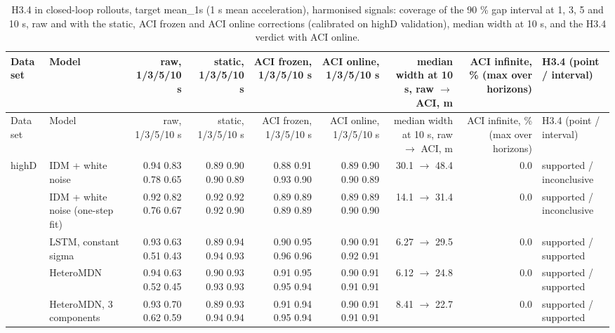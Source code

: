 \begingroup
\footnotesize
\begin{longtable}{llrrrrrrl}
\caption{H3.4 in closed-loop rollouts, target mean\_1s (1 s mean acceleration), harmonised signals: coverage of the 90 \% gap interval at 1, 3, 5 and 10 s, raw and with the static, ACI frozen and ACI online corrections (calibrated on highD validation), median width at 10 s, and the H3.4 verdict with ACI online.}\label{tab:t4-coverage--harmonised--mean-1s} \\
\toprule
Data set & Model & raw, 1/3/5/10 s & static, 1/3/5/10 s & ACI frozen, 1/3/5/10 s & ACI online, 1/3/5/10 s & median width at 10 s, raw $\rightarrow$ ACI, m & ACI infinite, \% (max over horizons) & H3.4 (point / interval) \\
\midrule
\endfirsthead
\toprule
Data set & Model & raw, 1/3/5/10 s & static, 1/3/5/10 s & ACI frozen, 1/3/5/10 s & ACI online, 1/3/5/10 s & median width at 10 s, raw $\rightarrow$ ACI, m & ACI infinite, \% (max over horizons) & H3.4 (point / interval) \\
\midrule
\endhead
\bottomrule
\endlastfoot
highD & IDM + white noise & 0.94 0.83 0.78 0.65 & 0.89 0.90 0.90 0.89 & 0.88 0.91 0.93 0.90 & 0.89 0.90 0.90 0.89 & 30.1 $\rightarrow$ 48.4 & 0.0 & supported / inconclusive \\
 & IDM + white noise (one-step fit) & 0.92 0.82 0.76 0.67 & 0.92 0.92 0.92 0.90 & 0.89 0.89 0.89 0.89 & 0.89 0.89 0.90 0.90 & 14.1 $\rightarrow$ 31.4 & 0.0 & supported / inconclusive \\
 & LSTM, constant sigma & 0.93 0.63 0.51 0.43 & 0.89 0.94 0.94 0.93 & 0.90 0.95 0.96 0.96 & 0.90 0.91 0.92 0.91 & 6.27 $\rightarrow$ 29.5 & 0.0 & supported / supported \\
 & HeteroMDN & 0.94 0.63 0.52 0.45 & 0.90 0.93 0.93 0.93 & 0.91 0.95 0.95 0.94 & 0.90 0.91 0.91 0.91 & 6.12 $\rightarrow$ 24.8 & 0.0 & supported / supported \\
 & HeteroMDN, 3 components & 0.93 0.70 0.62 0.59 & 0.89 0.93 0.94 0.94 & 0.91 0.94 0.95 0.94 & 0.90 0.91 0.91 0.91 & 8.41 $\rightarrow$ 22.7 & 0.0 & supported / supported \\

\end{longtable}
